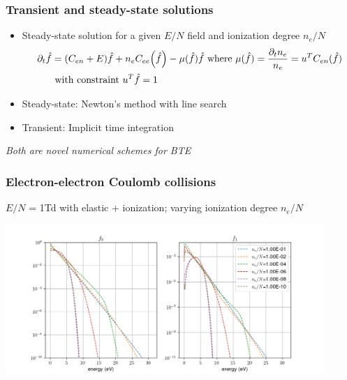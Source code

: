 \documentclass[mathserif, aspectratio=169]{beamer}
\newcommand{\of}[1]{\mleft( #1 \mright)}
\begin{document}
\begin{frame}
	\frametitle{Transient and steady-state solutions}
	\begin{itemize}
		\item Steady-state solution for a given $E/N$ field and ionization degree $n_e/N$ 
		\begin{align}
			\partial_t {\hat{f}} &=(C_{en}+E)\hat{f} + n_e C_{ee}\of{\hat{f}} - \mu(\hat{f}) \hat{f} \text{ where } \mu(\hat{f}) = \frac{\partial_t n_e}{n_e} = u^T C_{en}(\hat{f})\\
			&\text{ with constraint } u^T \hat{f} = 1 \nonumber 
		\end{align}
		\item Steady-state: Newton's method with line search
		\item Transient: Implicit time integration
	\end{itemize}
	\textit{Both are novel numerical schemes for BTE}
\end{frame}

\begin{frame}
	\frametitle{Electron-electron Coulomb collisions}
	$E/N$ = 1Td with elastic + ionization; varying ionization degree $n_e/N$
	\vspace*{-0.08in}
	\begin{center}
		\includegraphics[width=0.9\textwidth]{1Td_cc.png}
	\end{center}
\end{frame}
\end{document}
